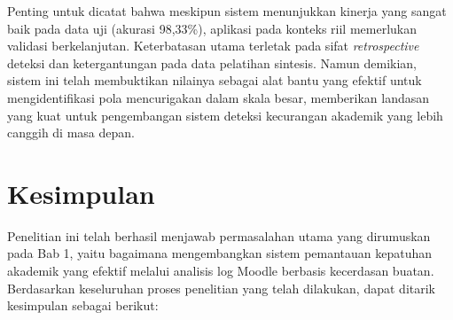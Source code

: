 Penting untuk dicatat bahwa meskipun sistem menunjukkan kinerja yang sangat baik pada data uji (akurasi 98,33\%), aplikasi pada konteks riil memerlukan validasi berkelanjutan. Keterbatasan utama terletak pada sifat \textit{retrospective} deteksi dan ketergantungan pada data pelatihan sintesis. Namun demikian, sistem ini telah membuktikan nilainya sebagai alat bantu yang efektif untuk mengidentifikasi pola mencurigakan dalam skala besar, memberikan landasan yang kuat untuk pengembangan sistem deteksi kecurangan akademik yang lebih canggih di masa depan.

\section{Kesimpulan}
\label{sec:kesimpulan_bab4}

Penelitian ini telah berhasil menjawab permasalahan utama yang dirumuskan pada Bab 1, yaitu bagaimana mengembangkan sistem pemantauan kepatuhan akademik yang efektif melalui analisis log Moodle berbasis kecerdasan buatan. Berdasarkan keseluruhan proses penelitian yang telah dilakukan, dapat ditarik kesimpulan sebagai berikut:

